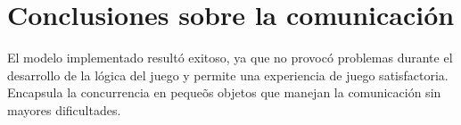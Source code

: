 \section{Conclusiones sobre la comunicaci\'on}

El modelo implementado result\'o exitoso, ya que no provoc\'o problemas durante el desarrollo de la l\'ogica del juego
y permite una experiencia de juego satisfactoria. Encapsula la concurrencia en peque\~os objetos que manejan la
comunicaci\'on sin mayores dificultades.

